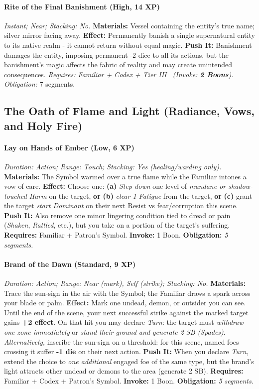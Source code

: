 \paragraph{Rite of the Final Banishment (High, 14 XP)} \emph{Instant; Near; Stacking: No.}
\textbf{Materials:} Vessel containing the entity's true name; silver mirror facing away.
\textbf{Effect:} Permanently banish a single supernatural entity to its native realm - it cannot return without equal magic.
\textbf{Push It:} Banishment damages the entity, imposing permanent -2 dice to all its actions, but the banishment's magic affects the fabric of reality and may create unintended consequences.
\emph{Requires: Familiar + Codex + Tier III \ (\textit{Invoke:} \textbf{2 Boons}).}
\emph{Obligation:} 7 segments.

\subsection{The Oath of Flame and Light (Radiance, Vows, and Holy Fire)}
\paragraph{Lay on Hands of Ember (Low, 6 XP)} \emph{Duration: Action; Range: Touch; Stacking: Yes (healing/warding only).}  
\textbf{Materials:} The Symbol warmed over a true flame while the Familiar intones a vow of care.  
\textbf{Effect:} Choose one: \textbf{(a)} \emph{Step down} one level of \emph{mundane or shadow-touched Harm} on the target, \textbf{or} \textbf{(b)} \emph{clear 1 Fatigue} from the target, \textbf{or} \textbf{(c)} grant the target \emph{start Dominant} on their next Resist vs fear/corruption this scene.  
\textbf{Push It:} Also remove one minor lingering condition tied to dread or pain (\emph{Shaken}, \emph{Rattled}, etc.), but you take on a portion of the target's suffering.
\textbf{Requires:} Familiar + Patron's Symbol. \;\; \textbf{Invoke:} 1 Boon. \;\; \textbf{Obligation:} \emph{5 segments.}

\paragraph{Brand of the Dawn (Standard, 9 XP)} \emph{Duration: Action; Range: Near (mark), Self (strike); Stacking: No.}  
\textbf{Materials:} Trace the sun-sign in the air with the Symbol; the Familiar draws a spark across your blade or palm.  
\textbf{Effect:} Mark one undead, demon, or outsider you can see. Until the end of the scene, your next successful strike against the marked target gains \textbf{+2 effect}. On that hit you may declare \emph{Turn}: the target must \emph{withdraw one zone immediately} or \emph{stand their ground and generate 2 SB (Spades)}.  
\emph{Alternatively,} inscribe the sun-sign on a threshold: for this scene, named foes crossing it suffer \textbf{-1 die} on their next action.  
\textbf{Push It:} When you declare \emph{Turn}, extend the choice to \emph{one additional} engaged foe of the same type, but the brand's light attracts other undead or demons to the area (generate 2 SB).
\textbf{Requires:} Familiar + Codex + Patron's Symbol. \;\; \textbf{Invoke:} 1 Boon. \;\; \textbf{Obligation:} \emph{5 segments.}

